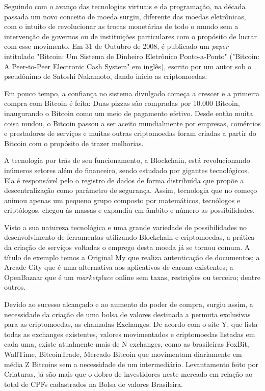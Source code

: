 Seguindo com o avanço das tecnologias virtuais e da programação, na década passada um novo conceito de moeda surgiu, diferente das moedas eletrônicas, com o intuito de revolucionar as trocas monetárias de todo o mundo sem a intervenção de governos ou de instituições particulares com o propósito de lucrar com esse movimento. Em 31 de Outubro de 2008, é publicado um \textit{paper} intitulado "Bitcoin: Um Sistema de Dinheiro Eletrônico Ponto-a-Ponto"  ("Bitcoin: A Peer-to-Peer Electronic Cash System" em inglês), escrito por um autor sob o pseudônimo de Satoshi Nakamoto, dando inicio as criptomoedas.

Em pouco tempo, a confiança no sistema divulgado começa a crescer e a primeira compra com Bitcoin é feita: Duas pizzas são compradas por 10.000 Bitcoin, inaugurando o Bitcoin como um meio de pagamento efetivo. Desde então muita coisa mudou, o Bitcoin passou a ser aceito mundialmente por empresas, comércios e prestadores de serviços e muitas outras criptomoedas foram criadas a partir do Bitcoin com o propósito de trazer melhorias. 

A tecnologia por trás de seu funcionamento, a Blockchain, está revolucionando inúmeros setores além do financeiro, sendo estudado por gigantes tecnológicos. Ela é responsável pelo o registro de dados de forma distribuída que propõe a descentralização como parâmetro de segurança. Assim, tecnologia que no começo animou apenas um pequeno grupo composto por matemáticos, tecnólogos e criptólogos, chegou às massas e expandiu em âmbito e número as possibilidades. 


Visto a sua natureza tecnológica e uma grande variedade de possibilidades no desenvolvimento de ferramentas utilizando Blockchain e criptomoedas, a prática da criação de serviços voltadas o emprego desta moeda já se tornou comum. A título de exemplo temos a Original My que realiza autenticação de documentos; a Arcade City que é uma alternativa aos aplicativos de carona existentes; a OpenBazaar que é um \textit{marketplace} online sem taxas, restrições ou terceiro; dentre outros. 

Devido ao sucesso alcançado e ao aumento do poder de compra, surgiu assim, a necessidade da criação de uma bolsa de valores destinada a permuta exclusivas para as criptomoedas, as chamadas Exchanges. De acordo com o site Y, que lista todas as exchanges existentes, valores movimentados e criptomoedas listadas em cada uma, existe atualmente mais de N exchanges, como as brasileiras FoxBit, WallTime, BitcoinTrade, Mercado Bitcoin que movimentam diariamente em média Z Bitcoins sem a necessidade de um intermediário. Levantamento feito por Criaturas, já são mais que o dobro de investidores neste mercado em relação ao total de CPFs cadastrados na Bolsa de valores Brasileira. 

